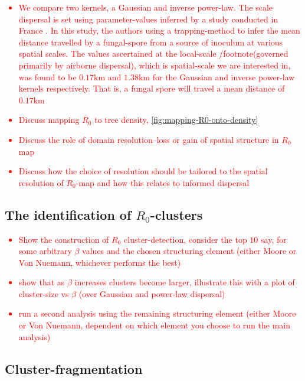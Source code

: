 \textcolor{red}{
\begin{itemize}
    \item We compare two kernels, a Gaussian and inverse power-law. The scale dispersal is set using parameter-values inferred by a study conducted in France \cite{grosdidier2018tracking}. In this study, the authors using a trapping-method to infer the mean distance travelled by a fungal-spore from a source of inoculum at various spatial scales. The values ascertained at the local-scale /footnote(governed primarily by airborne dispersal), which is spatial-scale we are interested in, was found to be $0.17\mathrm{km}$ and $1.38\mathrm{km}$ for the Gaussian and inverse power-law kernels respectively.
    That is, a fungal spore will travel a mean distance of $0.17\mathrm{km}$
    \item Discuss mapping $R_0$ to tree density, \ref{fig:mapping-R0-onto-density} 
    \item Discuss the role of domain resolution--loss or gain of spatial structure in $R_0$ map
    \item Discuss how the choice of resolution should be tailored to the spatial resolution of $R_0$-map and how this relates to informed dispersal
\end{itemize}
}

\subsection{The identification of $R_0$-clusters}

\textcolor{red}{
\begin{itemize}
    \item Show the construction of $R_0$ cluster-detection, consider the top $10$ say, for some arbitrary $\beta$ values and the chosen structuring element (either Moore or Von Nuemann, whichever performs the best)
    \item show that as $\beta$ increases clusters become larger, illustrate this with a plot of cluster-size vs $\beta$ (over Gaussian and power-law dispersal)
    \item run a second analysis using the remaining structuring element (either Moore or Von Nuemann, dependent on which element you choose to run the main analysis)
\end{itemize}}


\subsection{Cluster-fragmentation}

